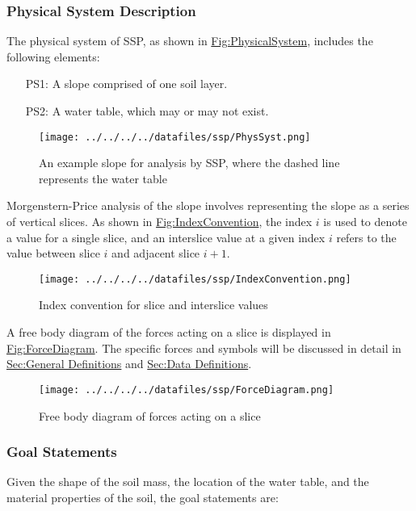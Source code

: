 \documentclass[12pt]{article}
\begin{document}
\subsubsection{Physical System Description}
\label{Sec:PhysSyst}
The physical system of SSP, as shown in \hyperref[Figure:PhysicalSystem]{Fig:PhysicalSystem}, includes the following elements:

\begin{itemize}
\item[PS1:]{A slope comprised of one soil layer.}
\item[PS2:]{A water table, which may or may not exist.}
\end{itemize}
\begin{figure}
\begin{center}
\texttt{[image: ../../../../datafiles/ssp/PhysSyst.png]}
\caption{An example slope for analysis by SSP, where the dashed line represents the water table}
\label{Figure:PhysicalSystem}
\end{center}
\end{figure}
Morgenstern-Price analysis \cite{morgenstern1965} of the slope involves representing the slope as a series of vertical slices. As shown in \hyperref[Figure:IndexConvention]{Fig:IndexConvention}, the index $i$ is used to denote a value for a single slice, and an interslice value at a given index $i$ refers to the value between slice $i$ and adjacent slice $i+1$.

\begin{figure}
\begin{center}
\texttt{[image: ../../../../datafiles/ssp/IndexConvention.png]}
\caption{Index convention for slice and interslice values}
\label{Figure:IndexConvention}
\end{center}
\end{figure}
A free body diagram of the forces acting on a slice is displayed in \hyperref[Figure:ForceDiagram]{Fig:ForceDiagram}. The specific forces and symbols will be discussed in detail in \hyperref[Sec:GDs]{Sec:General Definitions} and \hyperref[Sec:DDs]{Sec:Data Definitions}.

\begin{figure}
\begin{center}
\texttt{[image: ../../../../datafiles/ssp/ForceDiagram.png]}
\caption{Free body diagram of forces acting on a slice}
\label{Figure:ForceDiagram}
\end{center}
\end{figure}
\subsubsection{Goal Statements}
\label{Sec:GoalStmt}
Given the shape of the soil mass, the location of the water table, and the material properties of the soil, the goal statements are:
\end{document}
